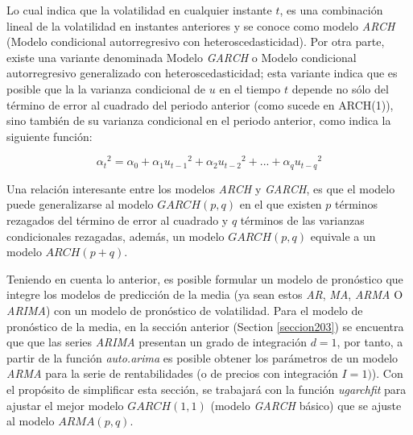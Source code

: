 \documentclass[11pt]{article}
\begin{document}
Lo cual indica que la volatilidad en cualquier instante \(t\), es una
combinación lineal de la volatilidad en instantes anteriores y se conoce
como modelo \emph{ARCH} (Modelo condicional autorregresivo con
heteroscedasticidad). Por otra parte, existe una variante denominada
Modelo \emph{GARCH} o Modelo condicional autorregresivo generalizado con
heteroscedasticidad; esta variante indica que es posible que la la
varianza condicional de \(u\) en el tiempo \(t\) depende no sólo del
término de error al cuadrado del periodo anterior (como sucede en
ARCH(1)), sino también de su varianza condicional en el periodo
anterior, como indica la siguiente función:

\begin{equation*}
{α_t}^2 =  α_0 + α_1{u_{t-1}}^2+α_2{u_{t-2}}^2+...+α_q{u_{t-q}}^2
\end{equation*}

Una relación interesante entre los modelos \emph{ARCH} y \emph{GARCH},
es que el modelo puede generalizarse al modelo \(GARCH(p,q)\) en el que
existen \(p\) términos rezagados del término de error al cuadrado y
\(q\) términos de las varianzas condicionales rezagadas, además, un
modelo \(GARCH(p,q)\) equivale a un modelo \(ARCH(p + q)\).

Teniendo en cuenta lo anterior, es posible formular un modelo de
pronóstico que integre los modelos de predicción de la media (ya sean
estos \emph{AR}, \emph{MA}, \emph{ARMA} O \emph{ARIMA}) con un modelo de
pronóstico de volatilidad. Para el modelo de pronóstico de la media, en
la sección anterior (Section \ref{seccion203}) se encuentra que que las
series \emph{ARIMA} presentan un grado de integración \(d=1\), por
tanto, a partir de la función \emph{auto.arima} es posible obtener los
parámetros de un modelo \emph{ARMA} para la serie de rentabilidades (o
de precios con integración \(I=1)\)). Con el propósito de simplificar
esta sección, se trabajará con la función \emph{ugarchfit} para ajustar
el mejor modelo \(GARCH(1,1)\) (modelo \emph{GARCH} básico) que se
ajuste al modelo \(ARMA(p,q)\).
\end{document}
